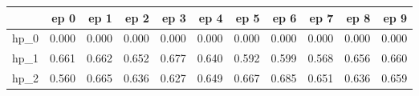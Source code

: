 \begin{tabular}{lrrrrrrrrrr}
\toprule
{} &   ep 0 &   ep 1 &   ep 2 &   ep 3 &   ep 4 &   ep 5 &   ep 6 &   ep 7 &   ep 8 &   ep 9 \\
\midrule
hp\_0 &  0.000 &  0.000 &  0.000 &  0.000 &  0.000 &  0.000 &  0.000 &  0.000 &  0.000 &  0.000 \\
hp\_1 &  0.661 &  0.662 &  0.652 &  0.677 &  0.640 &  0.592 &  0.599 &  0.568 &  0.656 &  0.660 \\
hp\_2 &  0.560 &  0.665 &  0.636 &  0.627 &  0.649 &  0.667 &  0.685 &  0.651 &  0.636 &  0.659 \\
\bottomrule
\end{tabular}
